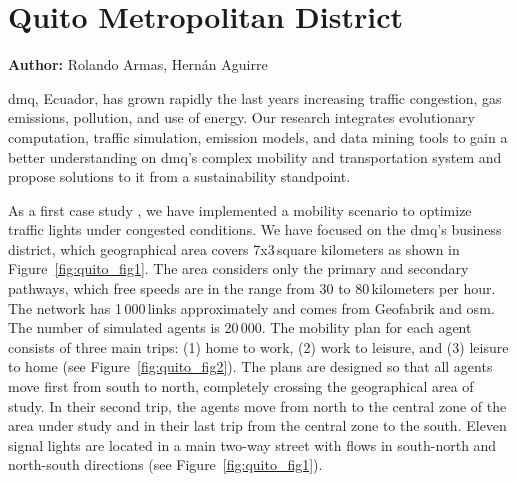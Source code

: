 \section{Quito Metropolitan District}
\label{sec:quito}
\hfill \textbf{Author:} Rolando Armas, Hernán Aguirre

\gls{dmq}, Ecuador, has grown rapidly the last years increasing traffic congestion, gas emissions, pollution, and use of energy. Our research integrates evolutionary computation, traffic simulation, emission models, and data mining tools to gain a better understanding on \gls{dmq}’s complex mobility and transportation system and propose solutions to it from a sustainability standpoint.

As a first case study \citep[][]{ArmasEtAl_SEAL_2014}, we have implemented a mobility scenario to optimize traffic lights under congested conditions. We have focused on the
\gls{dmq}’s business district, which geographical area covers 7x3\,square kilometers as shown in Figure~\ref{fig:quito_fig1}. The area considers only the primary and secondary pathways, which free speeds are in the range from 30 to 80\,kilometers per hour. The network has 1\,000\,links approximately and comes from Geofabrik and \gls{osm}. The number of simulated agents is 20\,000. The mobility plan for each agent consists of three main trips: (1) home to work, (2) work to leisure, and (3) leisure to home (see Figure~\ref{fig:quito_fig2}). The plans are designed so that all agents move first from south to north, completely crossing the geographical area of study. In their second trip, the agents move from north to the central zone of the area under study and in their last trip from the central zone to the south. Eleven signal lights are located in a main two-way street with flows in south-north and north-south directions (see Figure~\ref{fig:quito_fig1}).

